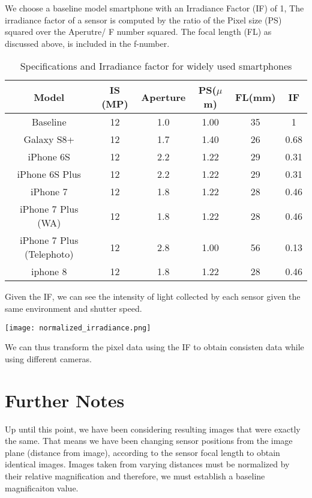 \documentclass{article}
\begin{document}
We choose a baseline model smartphone with an Irradiance Factor (IF) of 1,
The irradiance factor of a sensor is computed by the ratio of the Pixel size (PS) squared over
the Aperutre/ F number squared. The focal length (FL) as discussed above, is included in the f-number.

\begin{table}[h!]
\centering
\begin{tabular}{||c c c c c c||}
 \hline
 Model & IS (MP) & Aperture & PS($\mu$m) & FL(mm) & IF\\ [0.5ex]
 \hline\hline
 Baseline                  & 12 &1.0& 1.00 & 35 &1 \\
 Galaxy S8+                & 12 &1.7& 1.40 & 26 &0.68\\
 iPhone 6S                 & 12 &2.2& 1.22 & 29 &0.31\\
 iPhone 6S Plus            & 12 &2.2& 1.22 & 29 &0.31\\
 iPhone 7                  & 12 &1.8& 1.22 & 28 &0.46\\
 iPhone 7 Plus (WA)        & 12 &1.8& 1.22 & 28 &0.46\\
 iPhone 7 Plus (Telephoto) & 12 &2.8& 1.00 & 56 &0.13\\
 iphone 8                  & 12 &1.8& 1.22 & 28 &0.46\\[1ex]
 \hline
\end{tabular}
\caption{Specifications and Irradiance factor for widely used smartphones}
\label{table:1}
\end{table}

Given the IF, we can see the intensity of light collected by each sensor given the same
environment and shutter speed.

\begin{center}
  \texttt{[image: normalized\_irradiance.png]}
\end{center}

We can thus transform the pixel data using the IF to obtain consisten data while using
different cameras.
\section{Further Notes}

Up until this point, we have been considering resulting images that were exactly the same. That means
we have been changing sensor positions from the image plane (distance from image), according to the
sensor focal length to obtain identical images. Images taken from varying distances must be normalized
by their relative magnification and therefore, we must establish a baseline magnificaiton value.
\end{document}
